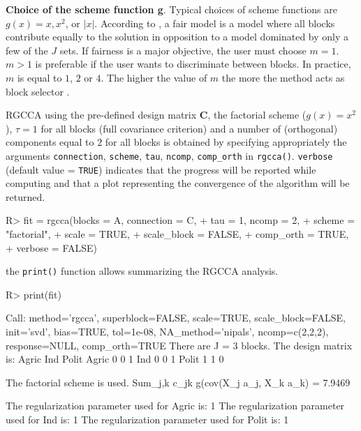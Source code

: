 \documentclass[
]{jss}
\begin{document}
\normalsize

\textbf{Choice of the scheme function g}. Typical choices of scheme
functions are \(g(x) = x, x^2\), or \(\vert x \vert\). According to
\citep{VandeGeer1984}, a fair model is a model where all blocks
contribute equally to the solution in opposition to a model dominated by
only a few of the \(J\) sets. If fairness is a major objective, the user
must choose \(m=1\). \(m>1\) is preferable if the user wants to
discriminate between blocks. In practice, \(m\) is equal to \(1\), \(2\)
or \(4\). The higher the value of \(m\) the more the method acts as
block selector \citep{Tenenhaus2017}.

RGCCA using the pre-defined design matrix \(\mathbf{C}\), the factorial
scheme (\(g(x) = x^2\)), \(\tau = 1\) for all blocks (full covariance
criterion) and a number of (orthogonal) components equal to \(2\) for
all blocks is obtained by specifying appropriately the arguments
\texttt{connection}, \texttt{scheme}, \texttt{tau}, \texttt{ncomp},
\texttt{comp\_orth} in \texttt{rgcca()}. \texttt{verbose} (default value
= \texttt{TRUE}) indicates that the progress will be reported while
computing and that a plot representing the convergence of the algorithm
will be returned.

\footnotesize

\begin{CodeChunk}
\begin{CodeInput}
R> fit = rgcca(blocks = A, connection = C, 
+             tau = 1, ncomp = 2,
+             scheme = "factorial",  
+             scale = TRUE, 
+             scale_block = FALSE,
+             comp_orth = TRUE,
+             verbose = FALSE)
\end{CodeInput}
\end{CodeChunk}

\normalsize

the \texttt{print()} function allows summarizing the RGCCA analysis.

\footnotesize

\begin{CodeChunk}
\begin{CodeInput}
R> print(fit)
\end{CodeInput}
\begin{CodeOutput}
Call: method='rgcca', superblock=FALSE, scale=TRUE, scale_block=FALSE, init='svd',
bias=TRUE, tol=1e-08, NA_method='nipals', ncomp=c(2,2,2), response=NULL,
comp_orth=TRUE 
There are J = 3 blocks.
The design matrix is:
      Agric Ind Polit
Agric     0   0     1
Ind       0   0     1
Polit     1   1     0

The factorial scheme is used.
Sum_{j,k} c_jk g(cov(X_j a_j, X_k a_k) = 7.9469 

The regularization parameter used for Agric is: 1
The regularization parameter used for Ind is: 1
The regularization parameter used for Polit is: 1
\end{CodeOutput}
\end{CodeChunk}
\end{document}
